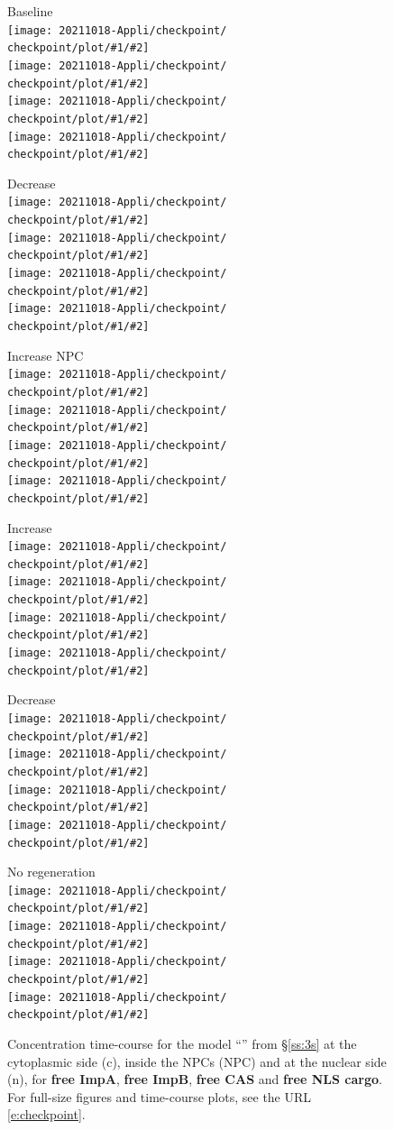 \documentclass[12pt,notitlepage]{article}
\def\[#1\]{\begin{align}#1\end{align}}
\begin{document}
\clearpage %

\begin{figure}[!h]
	\centering
	
	\vspace{-1\baselineskip}
	
	\newcommand{\fig}[2]{%
		\texttt{[image: 20211018-Appli/checkpoint/\\checkpoint/plot/\#1/\#2]}%
	}
	\newcommand{\figures}[1]{\fig{#1}{Free ImpA}\\\fig{#1}{Free ImpB}\\\fig{#1}{Free CAS}\\\fig{#1}{Free NLS}}
	
	\begin{minipage}{0.32\textwidth}
		\centering
		Baseline \\[0.5\baselineskip]
		\figures{a_Baseline}
	\end{minipage}
	\hfill
	\begin{minipage}{0.32\textwidth}
		\centering
		Decrease  \\[0.5\baselineskip]
		\figures{b_LowImpB}
	\end{minipage}
	\hfill
	\begin{minipage}{0.32\textwidth}
		\centering
		Increase NPC \\[0.5\baselineskip]
		\figures{c_MoreNPC}
	\end{minipage}

	\vspace{\baselineskip}

	\begin{minipage}{0.32\textwidth}
		\centering
		Increase  \\[0.5\baselineskip]
		\figures{d_HighImpA}
	\end{minipage}
	\hfill
	\begin{minipage}{0.32\textwidth}
		\centering
		Decrease  \\[0.5\baselineskip]
		\figures{d_LowImpA}
	\end{minipage}
	\hfill
	\begin{minipage}{0.32\textwidth}
		\centering
		No  regeneration \\[0.5\baselineskip]
		\figures{e_NoEnergy}
	\end{minipage}
	
	\vspace{\baselineskip}
		
	\caption{%
		Concentration time-course for the model 
		``'' from \S\ref{ss:3s}
		at the cytoplasmic side (c),
		inside the NPCs (NPC)
		and 
		at the nuclear side (n),
		for 
		\textbf{free ImpA},
		\textbf{free ImpB},
		\textbf{free CAS}
		and
		\textbf{free NLS cargo}.
		For full-size figures and time-course plots, see the URL \eqref{e:checkpoint}.
	}
	\label{f:app:3s-plot1}
\end{figure}
\end{document}
